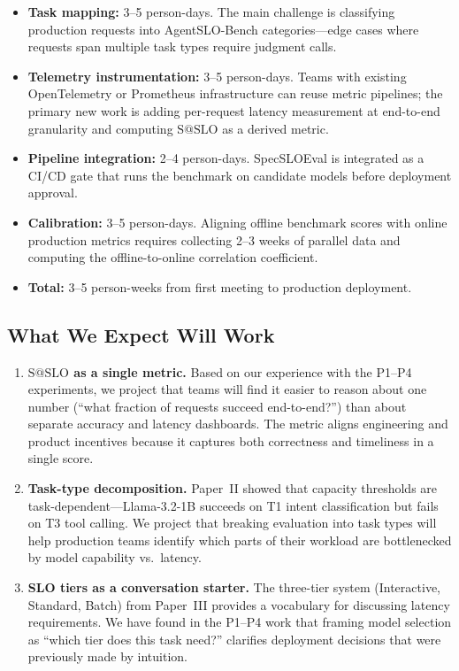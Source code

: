 \documentclass[11pt]{article}
\makeatletter
\newcommand{\sslo}{\ensuremath{\mathrm{S@SLO}}}
\makeatother
\begin{document}
\begin{itemize}[leftmargin=16pt]
    \item \textbf{Task mapping:} 3--5 person-days. The main challenge is classifying production requests into AgentSLO-Bench categories---edge cases where requests span multiple task types require judgment calls.
    \item \textbf{Telemetry instrumentation:} 3--5 person-days. Teams with existing OpenTelemetry or Prometheus infrastructure can reuse metric pipelines; the primary new work is adding per-request latency measurement at end-to-end granularity and computing $\sslo{}$ as a derived metric.
    \item \textbf{Pipeline integration:} 2--4 person-days. SpecSLOEval is integrated as a CI/CD gate that runs the benchmark on candidate models before deployment approval.
    \item \textbf{Calibration:} 3--5 person-days. Aligning offline benchmark scores with online production metrics requires collecting 2--3 weeks of parallel data and computing the offline-to-online correlation coefficient.
    \item \textbf{Total:} 3--5 person-weeks from first meeting to production deployment.
\end{itemize}

\subsection{What We Expect Will Work}

\begin{enumerate}[leftmargin=16pt]
    \item \textbf{$\sslo{}$ as a single metric.} Based on our experience with the P1--P4 experiments, we project that teams will find it easier to reason about one number (``what fraction of requests succeed end-to-end?'') than about separate accuracy and latency dashboards. The metric aligns engineering and product incentives because it captures both correctness and timeliness in a single score.

    \item \textbf{Task-type decomposition.} Paper~II showed that capacity thresholds are task-dependent---Llama-3.2-1B succeeds on T1 intent classification but fails on T3 tool calling. We project that breaking evaluation into task types will help production teams identify which parts of their workload are bottlenecked by model capability vs.\ latency.

    \item \textbf{SLO tiers as a conversation starter.} The three-tier system (Interactive, Standard, Batch) from Paper~III provides a vocabulary for discussing latency requirements. We have found in the P1--P4 work that framing model selection as ``which tier does this task need?'' clarifies deployment decisions that were previously made by intuition.
\end{enumerate}
\end{document}
